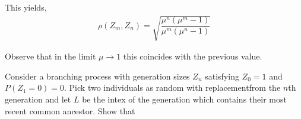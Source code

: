 \begin{solution}[Solution]
This yields,
\begin{align*}
    \rho(Z_m,Z_n) = \sqrt{\dfrac{\mu^n(\mu^m-1)}{\mu^m(\mu^n-1)}}
\end{align*}

Observe that in the limit \( \mu\to 1 \) this coincides with the previous value.

\iffalse
\begin{align*}
    \rho(Z_m,Z_n) &= \dfrac{\operatorname{Cov}(Z_n,Z_m)}{(\mathbb{V}[Z_n] \mathbb{V}[Z_m])^{1/2}} \\
    &= \dfrac{\EE[Z_nZ_m]-\EE[Z_n]\EE[Z_m]}{(n\sigma^2m\sigma^2)^{1/2}} \\
    &= \dfrac{\mu^{(n-m)/2}}{\sigma}\sqrt{\dfrac{\mu^m-1}{\mu^n-1}}
\end{align*}
\fi

\iffalse 
Clearly \( Z_n = \sum_{i=1}^{Z_m}Y_{m,i}  \). Then,
\begin{align*}
    \EE[Z_nZ_m] &= \EE\EE \left[ Z_m (Y_{m,1} + Y_{m,2} +...+Y_{m,Z_m} ) \big| Z_m \right] \\
    &= \EE\EE\left[ Z_mY_{m,1}+Z_mY_{m,2}+...+Z_mY_{m,Z_m}\big| Z_m \right] \\
    &= \EE \left[ Z_m \EE[Z_m Z_{n-m}|Z_m]  \right] \\
    &= \EE \left[ Z_m^2 \EE[Z_{n-m}|Z_m]\right] \\
    &= \EE \left[Z_m^2  \mu^{n-m} ] \\
    &= \mu^{n-m}\EE\left[Z_m^2\right]
\end{align*}

Then this is the sum of iid random variables so,
\begin{align*}
    
\end{align*}
\fi
\end{solution}

\begin{problem}[Exercise 3.3]
    Consider a branching process with generation sizes \( Z_n \) satisfying \( Z_0 = 1 \) and \( P(Z_1 = 0) = 0 \). Pick two individuals as random with replacementfrom the \( n \)th generation and let \( L \) be the intex of the generation which contains their most recent common ancestor. Show that 

\end{problem}

\begin{solution}[Solution]
    
\end{solution}


